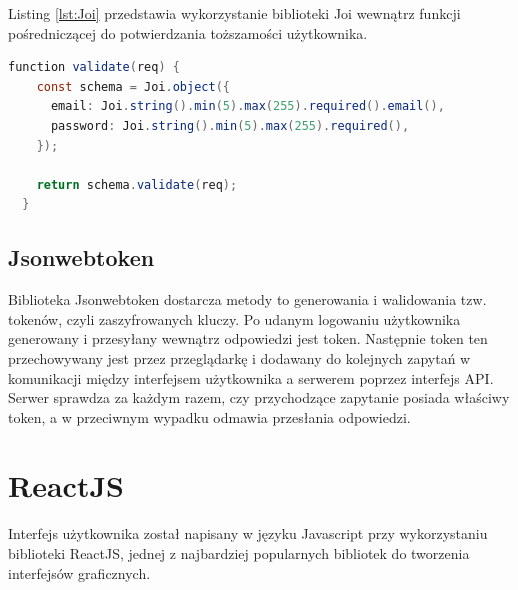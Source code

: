 \documentclass{sprz}
\begin{document}
Listing \ref{lst:Joi} przedstawia wykorzystanie biblioteki Joi wewnątrz funkcji pośredniczącej do potwierdzania toższamości użytkownika.

\begin{lstlisting}[language=Java,caption={Przykład wykorzystania Joi}, label={lst:Joi}]
  function validate(req) {
    const schema = Joi.object({
      email: Joi.string().min(5).max(255).required().email(),
      password: Joi.string().min(5).max(255).required(),
    });
  
    return schema.validate(req);
  }
\end{lstlisting}

\subsection{Jsonwebtoken}

Biblioteka Jsonwebtoken dostarcza metody to generowania i walidowania tzw. tokenów, czyli zaszyfrowanych kluczy. Po udanym logowaniu użytkownika generowany i przesyłany wewnątrz odpowiedzi jest token. Następnie token ten przechowywany jest przez przeglądarkę i dodawany do kolejnych zapytań w komunikacji między interfejsem użytkownika a serwerem poprzez interfejs API. Serwer sprawdza za każdym razem, czy przychodzące zapytanie posiada właściwy token, a w przeciwnym wypadku odmawia przesłania odpowiedzi.

\section{ReactJS}

Interfejs użytkownika został napisany w języku Javascript przy wykorzystaniu biblioteki ReactJS, jednej z najbardziej popularnych bibliotek do tworzenia interfejsów graficznych.
\end{document}
